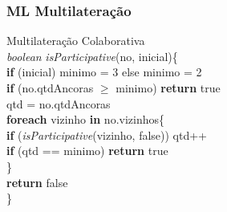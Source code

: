 \documentclass{beamer}
\begin{document}
\begin{frame}
\frametitle{\normalsize ML Multilateração}
\begin{flushleft}
	\vspace{-1.5cm}
	Multilateração Colaborativa\\
	\vspace{0.5cm}
	\textit{boolean} \textit{isParticipative}(no, inicial)\{
	\\ \hspace{0.5cm} \textbf{if} (inicial) minimo = 3 else minimo = 2
	\\ \hspace{0.5cm} \textbf{if} (no.qtdAncoras $\geq$ minimo) \textbf{return} true
	\\ \hspace{0.5cm} qtd = no.qtdAncoras
	\\ \hspace{0.5cm} \textbf{foreach} vizinho \textbf{in} no.vizinhos\{
	\\ \hspace{1.5cm} \textbf{if} (\textit{isParticipative}(vizinho, false)) qtd++
	\\ \hspace{1.5cm} \textbf{if} (qtd == minimo) \textbf{return} true
	\\ \hspace{0.5cm}\}
	\\ \hspace{0.5cm} \textbf{return} false
	\\\}
	\vspace{-0.2cm}
	
\end{flushleft}
\end{frame}
\end{document}
